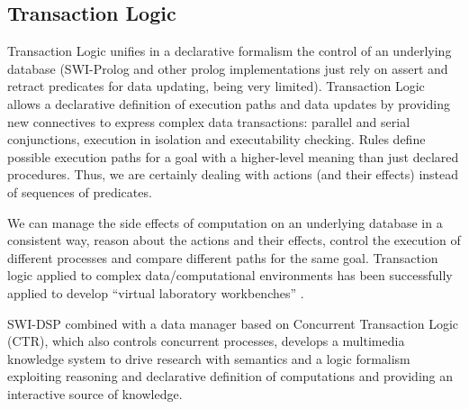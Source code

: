 \documentclass[runningheads]{llncs}
\begin{document}
\subsection{Transaction Logic}\label{subsec:ctl}

Transaction Logic \cite{ctl}  unifies in a declarative formalism the control of an underlying database (SWI-Prolog and other prolog implementations just rely on assert and retract predicates for data updating, being very limited). Transaction Logic allows a declarative definition of execution paths and data updates by providing new connectives to express complex data transactions: parallel and serial conjunctions, execution in isolation and executability checking. Rules define possible execution paths for a goal with a higher-level meaning than just declared procedures. Thus, we are certainly dealing with actions (and their effects) instead of sequences of predicates.

We can manage the side effects of computation on an underlying database in a consistent way, reason about the actions and their effects, control the execution of different processes and compare different paths for the same goal. Transaction logic applied to complex data/computational environments has been successfully applied to develop ``virtual laboratory workbenches'' \cite{virtual}. 

SWI-DSP combined with a data manager based on Concurrent Transaction Logic (CTR), which also controls concurrent processes, develops a multimedia knowledge system to drive research with semantics and a logic formalism exploiting reasoning and declarative definition of computations and providing an interactive source of knowledge.


\end{document}
